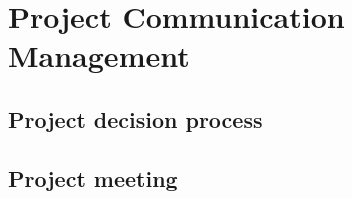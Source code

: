\chapter{Project Communication Management}

\section{Project decision process}

\section{Project meeting}